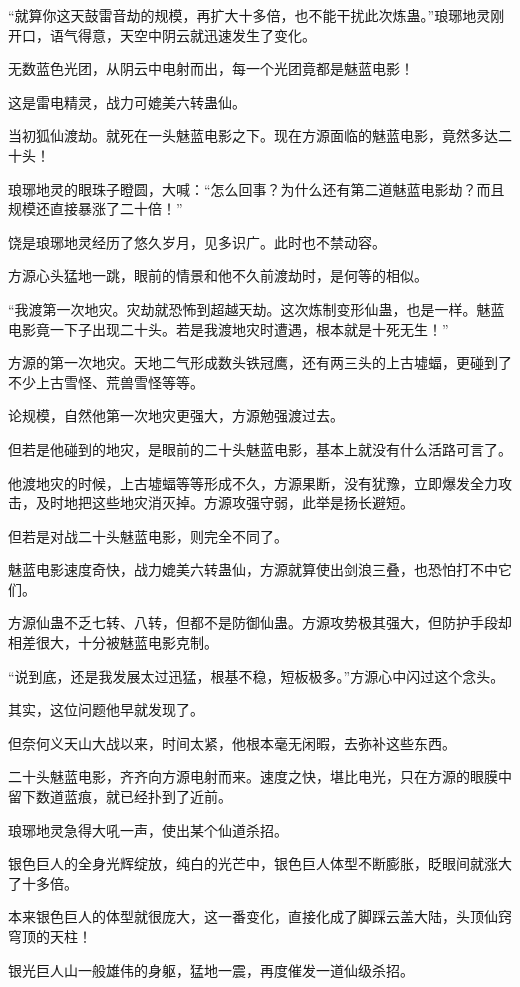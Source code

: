 \begin{this_body}
“就算你这天鼓雷音劫的规模，再扩大十多倍，也不能干扰此次炼蛊。”琅琊地灵刚开口，语气得意，天空中阴云就迅速发生了变化。

无数蓝色光团，从阴云中电射而出，每一个光团竟都是魅蓝电影！

这是雷电精灵，战力可媲美六转蛊仙。

当初狐仙渡劫。就死在一头魅蓝电影之下。现在方源面临的魅蓝电影，竟然多达二十头！

琅琊地灵的眼珠子瞪圆，大喊：“怎么回事？为什么还有第二道魅蓝电影劫？而且规模还直接暴涨了二十倍！”

饶是琅琊地灵经历了悠久岁月，见多识广。此时也不禁动容。

方源心头猛地一跳，眼前的情景和他不久前渡劫时，是何等的相似。

“我渡第一次地灾。灾劫就恐怖到超越天劫。这次炼制变形仙蛊，也是一样。魅蓝电影竟一下子出现二十头。若是我渡地灾时遭遇，根本就是十死无生！”

方源的第一次地灾。天地二气形成数头铁冠鹰，还有两三头的上古墟蝠，更碰到了不少上古雪怪、荒兽雪怪等等。

论规模，自然他第一次地灾更强大，方源勉强渡过去。

但若是他碰到的地灾，是眼前的二十头魅蓝电影，基本上就没有什么活路可言了。

他渡地灾的时候，上古墟蝠等等形成不久，方源果断，没有犹豫，立即爆发全力攻击，及时地把这些地灾消灭掉。方源攻强守弱，此举是扬长避短。

但若是对战二十头魅蓝电影，则完全不同了。

魅蓝电影速度奇快，战力媲美六转蛊仙，方源就算使出剑浪三叠，也恐怕打不中它们。

方源仙蛊不乏七转、八转，但都不是防御仙蛊。方源攻势极其强大，但防护手段却相差很大，十分被魅蓝电影克制。

“说到底，还是我发展太过迅猛，根基不稳，短板极多。”方源心中闪过这个念头。

其实，这位问题他早就发现了。

但奈何义天山大战以来，时间太紧，他根本毫无闲暇，去弥补这些东西。

二十头魅蓝电影，齐齐向方源电射而来。速度之快，堪比电光，只在方源的眼膜中留下数道蓝痕，就已经扑到了近前。

琅琊地灵急得大吼一声，使出某个仙道杀招。

银色巨人的全身光辉绽放，纯白的光芒中，银色巨人体型不断膨胀，眨眼间就涨大了十多倍。

本来银色巨人的体型就很庞大，这一番变化，直接化成了脚踩云盖大陆，头顶仙窍穹顶的天柱！

银光巨人山一般雄伟的身躯，猛地一震，再度催发一道仙级杀招。


\end{this_body}
